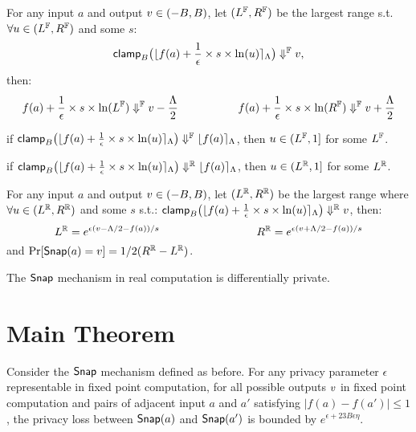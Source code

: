 \documentclass[a4paper,11pt]{article}
\begin{document}
\begin{lem}[roundRL]
\label{lem:roundrl}
For any input $a$ and output $v \in (-B, B)$,
let $(L^{\mathbb{F}}, R^{\mathbb{F}})$ be the largest range s.t. 
$\forall u \in (L^{\mathbb{F}}, R^{\mathbb{F}})$ and some $s$:
%
$$
\mathsf{clamp}_B \big(
	\lfloor f(a) + \frac{1}{\epsilon} \times s \times \ln (u) \rceil_{\Lambda}
	\big)
	\Downarrow^{\mathbb{F}} v,$$
then:
$$
f(a) + \frac{1}{\epsilon} \times s \times 
\ln (L^{\mathbb{F}})
\Downarrow^{\mathbb{F}} v - \frac{\Lambda}{2}
~~~~~~~~~~~~~~~~
f(a) + \frac{1}{\epsilon} \times s \times 
\ln (R^{\mathbb{F}})
\Downarrow^{\mathbb{F}} v + \frac{\Lambda}{2}
$$
\end{lem}
\begin{lem}[roundId]
\label{lem:roundid}
if 
$\mathsf{clamp}_B \big(
	\lfloor f(a) + \frac{1}{\epsilon} \times s \times \ln (u) \rceil_{\Lambda}
	\big)
	\Downarrow^{\mathbb{F}} \lfloor f(a) \rceil_{\Lambda}$, then $u \in (L^{\mathbb{F}}, 1]$ for some $L^{\mathbb{F}}$.
\item
if
$\mathsf{clamp}_B \big(
	\lfloor f(a) + \frac{1}{\epsilon} \times s \times \ln (u) \rceil_{\Lambda}
	\big)
	\Downarrow^{\mathbb{R}} \lfloor f(a) \rceil_{\Lambda}$, then $u \in (L^{\mathbb{R}}, 1]$ for some $L^{\mathbb{R}}$.
\end{lem}
%
%
%
%
\begin{lem}[idealRL]
\label{lem:idealrl}
For any input $a$ and output $v \in (-B, B)$,
let $(L^{\mathbb{R}}, R^{\mathbb{R}})$ be the largest range where 
$\forall u \in (L^{\mathbb{R}}, R^{\mathbb{R}})$ and some $s$ s.t.:
%
$\mathsf{clamp}_B \big(
	\lfloor f(a) + \frac{1}{\epsilon} \times s \times \ln (u) \rceil_{\Lambda}
	\big)
\Downarrow^{\mathbb{R}} v
$, then:
%
$$
L^{\mathbb{R}} = e^{\epsilon(v - \Lambda/2 - f(a))/s}
~~~~~~~~~~~~~~~~~~~~~~~~~~
R^{\mathbb{R}} = e^{\epsilon(v + \Lambda/2 - f(a))/s}
$$
and 
$\Pr[\mathsf{Snap}(a) = v] = 1/2(R^{\mathbb{R}} - L^{\mathbb{R}})$.
\end{lem}

\begin{lem}[idealDP]
\label{lem:idealdp}
The $\mathsf{Snap}$ mechanism in real computation is differentially private.
\end{lem}

\newpage
\section{Main Theorem}

\begin{thm}
%
Consider the $\mathsf{Snap}$ mechanism defined as before. For any privacy parameter $\epsilon$ representable in fixed point computation, for all possible outputs $v$ in fixed point computation and pairs of adjacent input $a$ and $a'$ satisfying $|f(a) - f(a')| \leq 1$, the privacy loss between $\mathsf{Snap}(a)$ and $\mathsf{Snap}(a')$ is bounded by $e^{\epsilon + 23 B \epsilon \eta}$.
\end{thm}
\end{document}
